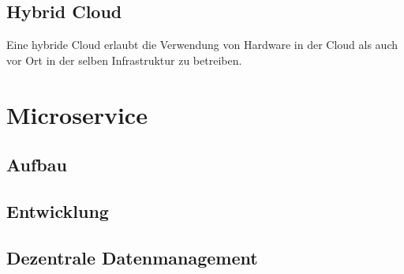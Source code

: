 \subsection{Hybrid Cloud}
Eine hybride Cloud erlaubt die Verwendung von Hardware in der Cloud als auch vor Ort
in der selben Infrastruktur zu betreiben.

\section{Microservice}
\subsection{Aufbau}
\subsection{Entwicklung}
\subsection{Dezentrale Datenmanagement}



